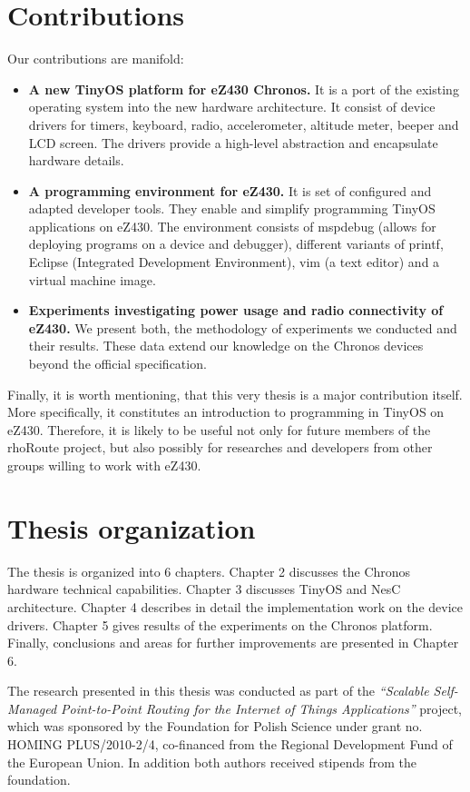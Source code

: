 \section{Contributions}
Our contributions are manifold:
\begin{itemize}
  \item \textbf{A new TinyOS platform for eZ430 Chronos.}
It is a port of the existing operating system into the new hardware architecture.
It consist of device drivers for timers, keyboard, radio, accelerometer, altitude meter, beeper and LCD screen.
The drivers provide a high-level abstraction and encapsulate hardware details.
  \item \textbf{A programming environment for eZ430.} It is set of configured and adapted developer tools. They enable and simplify programming TinyOS applications on eZ430.
    The environment consists of mspdebug (allows for deploying programs on a device and debugger), different variants of printf, Eclipse (Integrated Development Environment), vim (a text editor) and a virtual machine image.
  \item \textbf{Experiments investigating power usage and radio connectivity of eZ430.}
We present both, the methodology of experiments we conducted and their results.
These data extend our knowledge on the Chronos devices beyond the official specification.
\end{itemize}

Finally, it is worth mentioning, that this very thesis is a major contribution itself. More specifically, it constitutes an introduction to programming in TinyOS on eZ430. Therefore, it is likely to be useful not only for future members of the rhoRoute project, but also possibly for researches and developers from other groups willing to work with eZ430.

\section{Thesis organization}
The thesis is organized into 6 chapters. Chapter 2 discusses the Chronos hardware technical capabilities. Chapter 3 discusses TinyOS and NesC architecture. Chapter 4 describes in detail the implementation work on the device drivers. Chapter 5 gives results of the experiments on the Chronos platform. Finally, conclusions and areas for further improvements are presented in Chapter 6.

The research presented in this thesis was conducted as part of the {\it``Scalable Self-Managed Point-to-Point Routing for the Internet of Things Applications''} project, which was sponsored by the Foundation for Polish Science under grant no. HOMING PLUS/2010-2/4, co-financed from the Regional Development Fund of the European Union. In addition both authors received stipends from the foundation.

